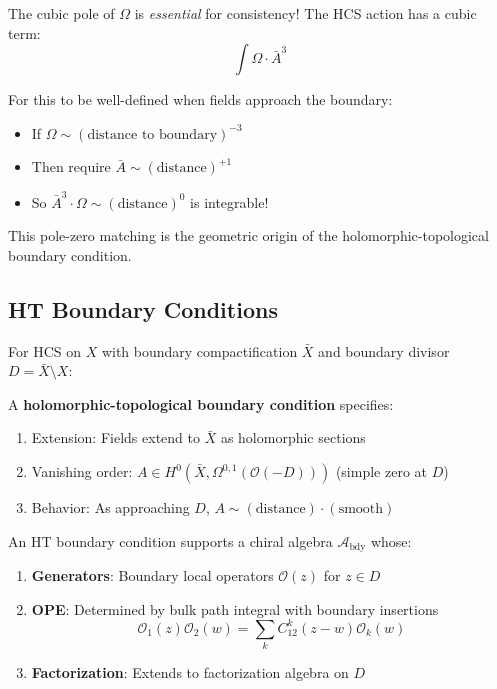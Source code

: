 \begin{remark}
The cubic pole of $\Omega$ is \emph{essential} for consistency! The HCS action 
has a cubic term:
$$\int \Omega \cdot \bar{A}^3$$

For this to be well-defined when fields approach the boundary:
\begin{itemize}
\item If $\Omega \sim (\text{distance to boundary})^{-3}$
\item Then require $\bar{A} \sim (\text{distance})^{+1}$
\item So $\bar{A}^3 \cdot \Omega \sim (\text{distance})^{0}$ is integrable!
\end{itemize}

This pole-zero matching is the geometric origin of the holomorphic-topological 
boundary condition.
\end{remark}

\subsection{HT Boundary Conditions}

\begin{definition}
For HCS on $X$ with boundary compactification $\bar{X}$ and boundary divisor 
$D = \bar{X} \setminus X$:

A \textbf{holomorphic-topological boundary condition} specifies:
\begin{enumerate}
\item Extension: Fields extend to $\bar{X}$ as holomorphic sections
\item Vanishing order: $A \in H^0(\bar{X}, \Omega^{0,1}(\mathcal{O}(-D)))$ (simple zero at $D$)
\item Behavior: As approaching $D$, $A \sim (\text{distance}) \cdot (\text{smooth})$
\end{enumerate}
\end{definition}

\begin{theorem}
An HT boundary condition supports a chiral algebra $\mathcal{A}_{\text{bdy}}$ whose:
\begin{enumerate}
\item \textbf{Generators}: Boundary local operators $\mathcal{O}(z)$ for $z \in D$
\item \textbf{OPE}: Determined by bulk path integral with boundary insertions
$$\mathcal{O}_1(z) \mathcal{O}_2(w) = \sum_k C_{12}^k(z-w) \mathcal{O}_k(w)$$
\item \textbf{Factorization}: Extends to factorization algebra on $D$
\end{enumerate}
\end{theorem}

